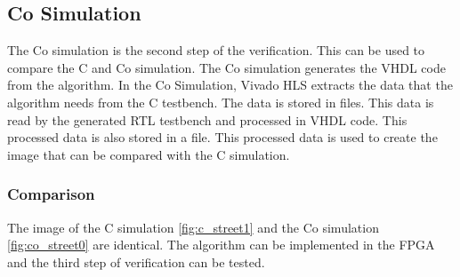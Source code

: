 %
%

\subsection{Co Simulation} \label{sec:cosim}
The Co simulation is the second step of the verification. This can be used to compare the C and Co simulation. The Co simulation generates the VHDL code from the algorithm.
In the Co Simulation, Vivado HLS extracts the data that the algorithm needs from the C testbench. The data is stored in files. This data is read by the generated RTL testbench and processed in VHDL code. This processed data is also stored in a file. This processed data is used to create the image that can be compared with the C simulation.

\subsubsection*{Comparison}
The image of the C simulation \ref{fig:c_street1} and the Co simulation \ref{fig:co_street0} are identical. The algorithm can be implemented in the FPGA and the third step of verification can be tested. \\

